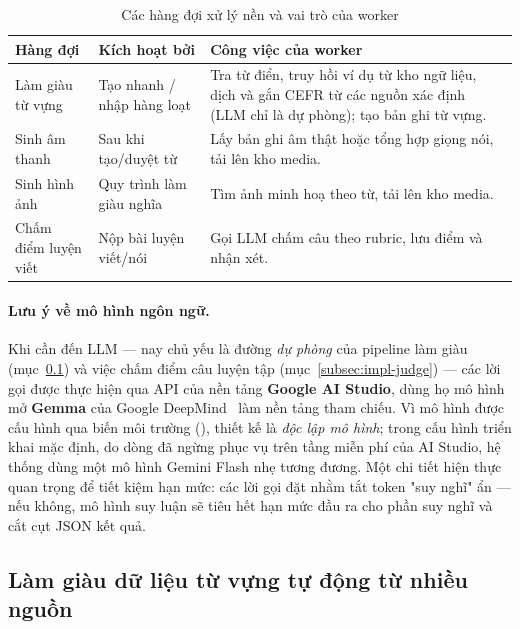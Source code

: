 \begin{table}[h]
  \centering
  \small
  \renewcommand{\arraystretch}{1.3}
  \begin{tabular}{|p{3.0cm}|p{4.6cm}|p{6.4cm}|}
    \hline
    \textbf{Hàng đợi} & \textbf{Kích hoạt bởi} & \textbf{Công việc của worker} \\
    \hline
    Làm giàu từ vựng & Tạo nhanh / nhập hàng loạt & Tra từ điển, truy hồi ví dụ từ kho ngữ liệu, dịch và gắn CEFR từ các nguồn xác định (LLM chỉ là dự phòng); tạo bản ghi từ vựng. \\
    \hline
    Sinh âm thanh & Sau khi tạo/duyệt từ & Lấy bản ghi âm thật hoặc tổng hợp giọng nói, tải lên kho media. \\
    \hline
    Sinh hình ảnh & Quy trình làm giàu nghĩa & Tìm ảnh minh hoạ theo từ, tải lên kho media. \\
    \hline
    Chấm điểm luyện viết & Nộp bài luyện viết/nói & Gọi LLM chấm câu theo rubric, lưu điểm và nhận xét. \\
    \hline
  \end{tabular}
  \caption{Các hàng đợi xử lý nền và vai trò của worker}
  \label{tab:async-jobs}
\end{table}

\paragraph{Lưu ý về mô hình ngôn ngữ.} Khi cần đến LLM --- nay chủ yếu là
đường \textit{dự phòng} của pipeline làm giàu (mục~\ref{subsec:impl-enrich})
và việc chấm điểm câu luyện tập (mục~\ref{subsec:impl-judge}) --- các lời gọi
được thực hiện qua API  của nền tảng \textbf{Google AI
Studio}, dùng họ mô hình mở \textbf{Gemma} của Google
DeepMind~\cite{gemma2025technical} làm nền tảng tham chiếu. Vì mô hình được cấu hình qua biến môi trường
(), thiết kế là \textit{độc lập mô hình}; trong cấu hình
triển khai mặc định, do dòng  đã ngừng phục vụ trên tầng miễn
phí của AI Studio, hệ thống dùng một mô hình Gemini Flash nhẹ tương đương.
Một chi tiết hiện thực quan trọng để tiết kiệm hạn mức: các lời gọi đặt
 nhằm tắt token "suy nghĩ" ẩn ---
nếu không, mô hình suy luận sẽ tiêu hết hạn mức đầu ra cho phần suy nghĩ và
cắt cụt JSON kết quả.

\subsection{Làm giàu dữ liệu từ vựng tự động từ nhiều nguồn}
\label{subsec:impl-enrich}

